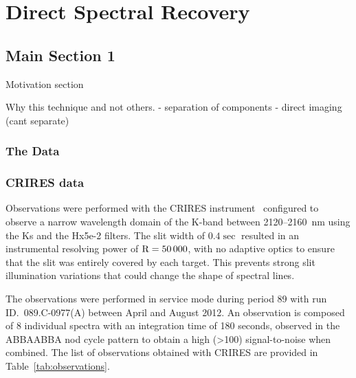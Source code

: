 

\chapter{Direct Spectral Recovery}  %
\label{cha:Chapter3} 

\section{Main Section 1}

Motivation section

Why this technique and not  others.
- separation of components
- direct imaging (cant separate)

\subsection{The Data}

\subsection{CRIRES data}
\label{subsec:CRIRES} 
Observations were performed with the CRIRES instrument~\citep{kaeufl_crires_2004} configured to observe a narrow wavelength domain of the K-band between 2120--2160~nm using the Ks and the Hx5e-2 filters. The slit width of \(0.4\sec\) resulted in an instrumental resolving power of \(\rm R=50\,000\), with no adaptive optics to ensure that the slit was entirely covered by each target. This prevents strong slit illumination variations that could change the shape of spectral lines.

The observations were performed in service mode during period 89 with run ID.~089.C-0977(A) between April and August 2012. An observation is composed of 8 individual spectra with an integration time of 180 seconds, observed in the ABBAABBA nod cycle pattern to obtain a high (>100) signal-to-noise when combined. The list of observations obtained with CRIRES are provided in Table~\ref{tab:observations}.

